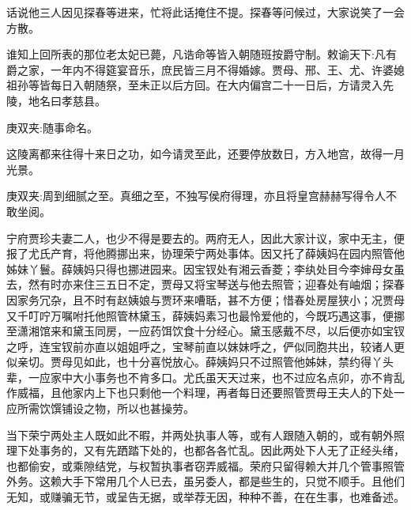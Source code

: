 

\begin{parag}
    话说他三人因见探春等进来，忙将此话掩住不提。探春等问候过，大家说笑了一会方散。
\end{parag}


\begin{parag}
    谁知上回所表的那位老太妃已薨，凡诰命等皆入朝随班按爵守制。敕谕天下:凡有爵之家，一年内不得筵宴音乐，庶民皆三月不得婚嫁。贾母、邢、王、尤、许婆媳祖孙等皆每日入朝随祭，至未正以后方回。在大内偏宫二十一日后，方请灵入先陵，地名曰孝慈县。\begin{note}庚双夹:随事命名。\end{note}这陵离都来往得十来日之功，如今请灵至此，还要停放数日，方入地宫，故得一月光景。\begin{note}庚双夹:周到细腻之至。真细之至，不独写侯府得理，亦且将皇宫赫赫写得令人不敢坐阅。\end{note}宁府贾珍夫妻二人，也少不得是要去的。两府无人，因此大家计议，家中无主，便报了尤氏产育，将他腾挪出来，协理荣宁两处事体。因又托了薛姨妈在园内照管他姊妹丫鬟。薛姨妈只得也挪进园来。因宝钗处有湘云香菱；李纨处目今李婶母女虽去，然有时亦来住三五日不定，贾母又将宝琴送与他去照管；迎春处有岫烟；探春因家务冗杂，且不时有赵姨娘与贾环来嘈聒，甚不方便；惜春处房屋狭小；况贾母又千叮咛万嘱咐托他照管林黛玉，薛姨妈素习也最怜爱他的，今既巧遇这事，便挪至潇湘馆来和黛玉同房，一应药饵饮食十分经心。黛玉感戴不尽，以后便亦如宝钗之呼，连宝钗前亦直以姐姐呼之，宝琴前直以妹妹呼之，俨似同胞共出，较诸人更似亲切。贾母见如此，也十分喜悦放心。薛姨妈只不过照管他姊妹，禁约得丫头辈，一应家中大小事务也不肯多口。尤氏虽天天过来，也不过应名点卯，亦不肯乱作威福，且他家内上下也只剩他一个料理，再者每日还要照管贾母王夫人的下处一应所需饮馔铺设之物，所以也甚操劳。
\end{parag}


\begin{parag}
    当下荣宁两处主人既如此不暇，并两处执事人等，或有人跟随入朝的，或有朝外照理下处事务的，又有先跴踏下处的，也都各各忙乱。因此两处下人无了正经头绪，也都偷安，或乘隙结党，与权暂执事者窃弄威福。荣府只留得赖大并几个管事照管外务。这赖大手下常用几个人已去，虽另委人，都是些生的，只觉不顺手。且他们无知，或赚骗无节，或呈告无据，或举荐无因，种种不善，在在生事，也难备述。
\end{parag}


